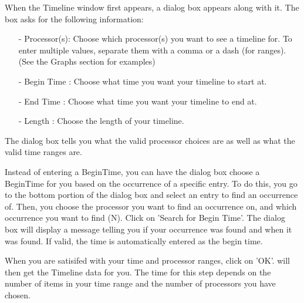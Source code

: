 \documentclass[10pt,dvips]{article}
\begin{document}
      When the Timeline window first appears, a dialog box appears along with it.
   The box asks for the following information:
   \begin{itemize}
   \item[-]
     Processor(s):  Choose which processor(s) you want to see a timeline for.
                    To enter multiple values, separate them with a comma or a
                    dash (for ranges).  (See the Graphs section for examples)
   \item[-]
     Begin Time  : Choose what time you want your timeline to start at.
   \item[-]
     End Time    : Choose what time you want your timeline to end at.
   \item[-]
     Length      : Choose the length of your timeline.
   \end{itemize}

   The dialog box tells you what the valid processor choices are as well as what
   the valid time ranges are.

   Instead of entering a BeginTime, you can have the dialog box choose a
   BeginTime for you based on the occurrence of a specific entry.  To do this,
   you go to the bottom portion of the dialog box and select an entry to find an
   occurrence of.  Then, you choose the processor you want to find an occurrence
   on, and which occurrence you want to find (N).  Click on 'Search for Begin
   Time'.  The dialog box will display a message telling you if your occurrence
   was found and when it was found.  If valid, the time is automatically entered
   as the begin time.

   When you are satisifed with your time and processor ranges, click on 'OK'.
   \projections{} will then get the Timeline data for you.  The time for this step
   depends on the number of items in your time range and the number of
   processors you have chosen.
\end{document}
